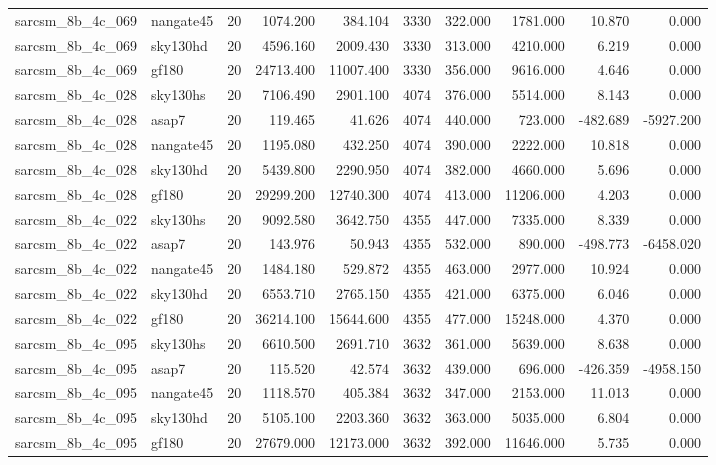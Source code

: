 \documentclass{article}
\begin{document}
\begin{longtable}{llrrrrrrrr}
sarcsm\_8b\_4c\_069 & nangate45 & 20 & 1074.200 & 384.104 & 3330 & 322.000 & 1781.000 & 10.870 & 0.000 \\
sarcsm\_8b\_4c\_069 & sky130hd & 20 & 4596.160 & 2009.430 & 3330 & 313.000 & 4210.000 & 6.219 & 0.000 \\
sarcsm\_8b\_4c\_069 & gf180 & 20 & 24713.400 & 11007.400 & 3330 & 356.000 & 9616.000 & 4.646 & 0.000 \\
sarcsm\_8b\_4c\_028 & sky130hs & 20 & 7106.490 & 2901.100 & 4074 & 376.000 & 5514.000 & 8.143 & 0.000 \\
sarcsm\_8b\_4c\_028 & asap7 & 20 & 119.465 & 41.626 & 4074 & 440.000 & 723.000 & -482.689 & -5927.200 \\
sarcsm\_8b\_4c\_028 & nangate45 & 20 & 1195.080 & 432.250 & 4074 & 390.000 & 2222.000 & 10.818 & 0.000 \\
sarcsm\_8b\_4c\_028 & sky130hd & 20 & 5439.800 & 2290.950 & 4074 & 382.000 & 4660.000 & 5.696 & 0.000 \\
sarcsm\_8b\_4c\_028 & gf180 & 20 & 29299.200 & 12740.300 & 4074 & 413.000 & 11206.000 & 4.203 & 0.000 \\
sarcsm\_8b\_4c\_022 & sky130hs & 20 & 9092.580 & 3642.750 & 4355 & 447.000 & 7335.000 & 8.339 & 0.000 \\
sarcsm\_8b\_4c\_022 & asap7 & 20 & 143.976 & 50.943 & 4355 & 532.000 & 890.000 & -498.773 & -6458.020 \\
sarcsm\_8b\_4c\_022 & nangate45 & 20 & 1484.180 & 529.872 & 4355 & 463.000 & 2977.000 & 10.924 & 0.000 \\
sarcsm\_8b\_4c\_022 & sky130hd & 20 & 6553.710 & 2765.150 & 4355 & 421.000 & 6375.000 & 6.046 & 0.000 \\
sarcsm\_8b\_4c\_022 & gf180 & 20 & 36214.100 & 15644.600 & 4355 & 477.000 & 15248.000 & 4.370 & 0.000 \\
sarcsm\_8b\_4c\_095 & sky130hs & 20 & 6610.500 & 2691.710 & 3632 & 361.000 & 5639.000 & 8.638 & 0.000 \\
sarcsm\_8b\_4c\_095 & asap7 & 20 & 115.520 & 42.574 & 3632 & 439.000 & 696.000 & -426.359 & -4958.150 \\
sarcsm\_8b\_4c\_095 & nangate45 & 20 & 1118.570 & 405.384 & 3632 & 347.000 & 2153.000 & 11.013 & 0.000 \\
sarcsm\_8b\_4c\_095 & sky130hd & 20 & 5105.100 & 2203.360 & 3632 & 363.000 & 5035.000 & 6.804 & 0.000 \\
sarcsm\_8b\_4c\_095 & gf180 & 20 & 27679.000 & 12173.000 & 3632 & 392.000 & 11646.000 & 5.735 & 0.000 \\

\end{longtable}
\end{document}
